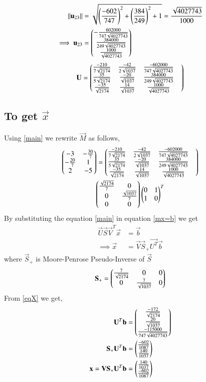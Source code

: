 \documentclass[journal,12pt,twocolumn]{IEEEtran}
\begin{document}
\begin{align}
	\left\lVert\mathbf{u}_{23}\right\rVert &=\sqrt{\left(\frac{-602}{747}\right)^2+\left(\frac{384}{249}\right)^2+1}= \frac{\sqrt{4027743}}{1000}\\
	\implies \mathbf{u}_{23} &=\begin{pmatrix}-\frac{602000}{747\sqrt{4027743}} \\ \frac{384000}{249\sqrt{4027743}}\\
		                      \frac{1000}{\sqrt{4027743}}\end{pmatrix}
\end{align}
\begin{align}
	\mathbf{U}=\begin{pmatrix}\frac{-210}{7\sqrt{2174}} & \frac{-42}{2\sqrt{1037}} & \frac{-602000}{747\sqrt{4027743}} &\\ \frac{35}{5\sqrt{2174}}& \frac{-20}{\sqrt{1037}}&  \frac{384000}{249\sqrt{4027743}} \\
		\frac{-35}{\sqrt{2174}}& \frac{14}{\sqrt{1037}} &   \frac{1000}{\sqrt{4027743}}\end{pmatrix}
\end{align}
\subsection{To get $\vec{x}$ }
Using \eqref{main} we rewrite $\vec{M}$ as follows,
\begin{multline}
		\begin{pmatrix}-3&-\frac{30}{7} \\-\frac{20}{7} & 1 \\ 2 & -5\end{pmatrix} =
		\begin{pmatrix}\frac{-210}{7\sqrt{2174}} & \frac{-42}{2\sqrt{1037}} & \frac{-602000}{747\sqrt{4027743}} &\\ \frac{35}{5\sqrt{2174}}& \frac{-20}{\sqrt{1037}}&  \frac{384000}{249\sqrt{4027743}} \\
			\frac{-35}{\sqrt{2174}}& \frac{14}{\sqrt{1037}} &   \frac{1000}{\sqrt{4027743}}\end{pmatrix} \\
    	\begin{pmatrix}\frac{\sqrt{2174}}{7} & 0\\ 0 & \frac{\sqrt{1037}}{7} \\ 0 &0\end{pmatrix}
		\begin{pmatrix}0 & 1\\1 & 0\end{pmatrix}^T
\end{multline}
By substituting the equation \eqref{main} in equation \eqref{mx=b} we get 
\begin{align}
	\vec{U}\vec{S}\vec{V}^T\vec{x} & = \vec{b}\\
	\implies\vec{x} &= \vec{V}\vec{S}_+\vec{U^T}\vec{b} \label{eqX}
\end{align}
where $\vec{S}_+$ is Moore-Penrose Pseudo-Inverse of $\vec{S}$
\begin{align}
	\mathbf{S}_+=\begin{pmatrix}\frac{7}{\sqrt{2174}} & 0 & 0 \\ 0 & \frac{7}{\sqrt{1037}} & 0\end{pmatrix}
\end{align}
From \eqref{eqX} we get,
\begin{align}
	\mathbf{U}^T\mathbf{b}&=\begin{pmatrix}\frac{-172}{\sqrt{2174}} \\ \frac{20}{\sqrt{1037}} \\ \frac{-115000}{747\sqrt{4027743}}\end{pmatrix}\\ 
	\mathbf{S}_+\mathbf{U}^T\mathbf{b}&=\begin{pmatrix}\frac{-602}{1087} \\ \frac{140}{1037}\end{pmatrix}\\
	\mathbf{x} = \mathbf{V}\mathbf{S}_+\mathbf{U}^T\mathbf{b} &= \begin{pmatrix}\frac{140}{1037} \\ \frac{-602}{1087}\end{pmatrix}\label{eqXSol1}
\end{align}
\end{document}

